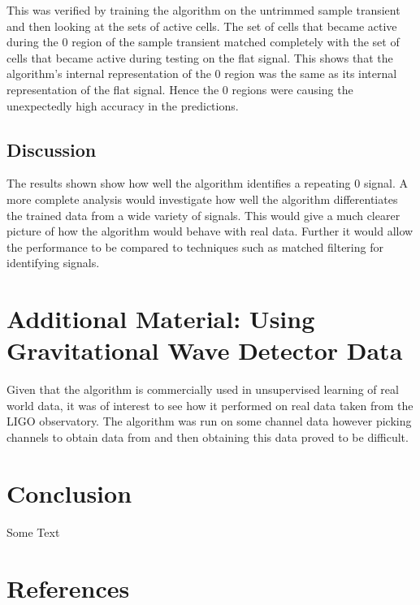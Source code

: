 \documentclass[a4paper]{jpconf}
\begin{document}
		This was verified by training the algorithm on the untrimmed sample transient and then looking at the sets of active cells. The set of cells that became active during the 0 region of the sample transient matched completely with the set of cells that became active during testing on the flat signal. This shows that the algorithm's internal representation of the 0 region was the same as its internal representation of the flat signal. Hence the 0 regions were causing the unexpectedly high accuracy in the predictions.
		 
	\subsection{Discussion}
		The results shown show how well the algorithm identifies a repeating 0 signal. A more complete analysis would investigate how well the algorithm differentiates the trained data from a wide variety of signals. This would give a much clearer picture of how the algorithm would behave with real data. Further it would allow the performance to be compared to techniques such as matched filtering for identifying signals.
		
\section{Additional Material: Using Gravitational Wave Detector Data}
	Given that the algorithm is commercially used in unsupervised learning of real world data, it was of interest to see how it performed on real data taken from the LIGO observatory. The algorithm was run on some channel data however picking channels to obtain data from and then obtaining this data proved to be difficult.

\section{Conclusion}
	Some Text \cite{saulson_fundamentals_1994}
	
\section*{References}


\end{document}
